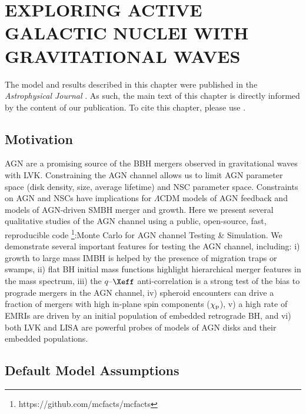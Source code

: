 
\section{\texorpdfstring{\MakeUppercase{exploring active galactic nuclei with gravitational waves}}{exploring active galactic nuclei with gravitational waves}}
\label{sec:chapter-agnbbh}


\par The model and results described in this chapter were published in the \textit{Astrophysical Journal} \citep{McKernan+25-mcfactsI}.
As such, the main text of this chapter is directly informed by the content of our publication.
To cite this chapter, please use \citet{McKernan+25-mcfactsI}.

\subsection{Motivation}

AGN are a promising source of the BBH mergers observed in gravitational waves with LVK.
Constraining the AGN channel allows us to limit AGN parameter space (disk density, size, average lifetime) and NSC parameter space.
Constraints on AGN and NSCs have implications for $\Lambda$CDM models of AGN feedback and models of AGN-driven SMBH merger and growth.
Here we present several qualitative studies of the AGN channel using a public, open-source, fast, reproducible code \footnote{https://github.com/mcfacts/mcfacts}:Monte Carlo for AGN channel Testing \& Simulation.
We demonstrate several important features for testing the AGN channel, including:
i) growth to large mass IMBH is helped by the presence of migration traps or swamps,
ii) flat BH initial mass functions highlight hierarchical merger features in the mass spectrum,
iii) the $q$--$\Xeff$ anti-correlation is a strong test of the bias to prograde mergers in the AGN channel,
iv) spheroid encounters can drive a fraction of mergers with high in-plane spin components ($\chi_{\rm p}$),
v) a high rate of EMRIs are driven by an initial population of embedded retrograde BH, and
vi) both LVK and LISA are powerful probes of models of AGN disks and their embedded populations.


\subsection{Default Model Assumptions}
\label{sec:mcfacts-assumptions}

